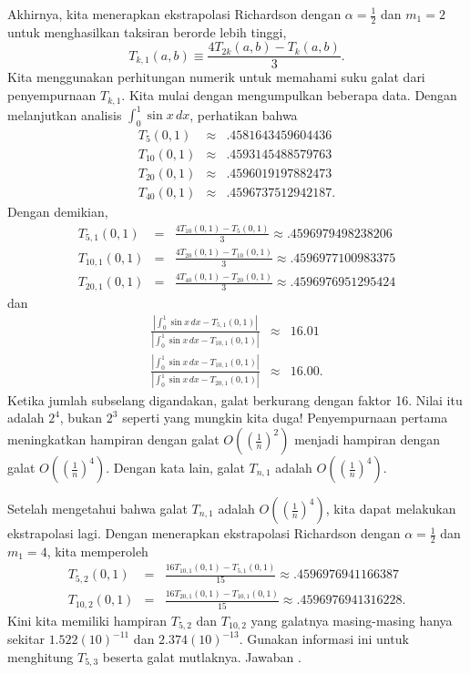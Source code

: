 Akhirnya, kita menerapkan ekstrapolasi Richardson dengan $\alpha=\frac{1}{2}$
dan $m_{1}=2$ untuk menghasilkan taksiran berorde lebih tinggi,
\[
T_{k,1}(a,b)\equiv\frac{4T_{2k}(a,b)-T_{k}(a,b)}{3}.
\]
Kita menggunakan perhitungan numerik untuk memahami suku galat dari
penyempurnaan $T_{k,1}$. Kita mulai dengan mengumpulkan beberapa
data. Dengan melanjutkan analisis $\int_{0}^{1}\sin x\,dx$, perhatikan
bahwa
\begin{eqnarray*}
T_{5}(0,1) & \approx & .4581643459604436\\
T_{10}(0,1) & \approx & .4593145488579763\\
T_{20}(0,1) & \approx & .4596019197882473\\
T_{40}(0,1) & \approx & .4596737512942187.
\end{eqnarray*}
Dengan demikian,
\begin{eqnarray*}
T_{5,1}(0,1) & = & \frac{4T_{10}(0,1)-T_{5}(0,1)}{3}\approx.4596979498238206\\
T_{10,1}(0,1) & = & \frac{4T_{20}(0,1)-T_{10}(0,1)}{3}\approx.4596977100983375\\
T_{20,1}(0,1) & = & \frac{4T_{40}(0,1)-T_{20}(0,1)}{3}\approx.4596976951295424
\end{eqnarray*}
dan
\begin{eqnarray*}
\frac{\left|\int_{0}^{1}\sin x\,dx-T_{5,1}(0,1)\right|}{\left|\int_{0}^{1}\sin x\,dx-T_{10,1}(0,1)\right|} & \approx & 16.01\\
\frac{\left|\int_{0}^{1}\sin x\,dx-T_{10,1}(0,1)\right|}{\left|\int_{0}^{1}\sin x\,dx-T_{20,1}(0,1)\right|} & \approx & 16.00.
\end{eqnarray*}
Ketika jumlah subselang digandakan, galat berkurang dengan faktor
16. Nilai itu adalah $2^{4}$, bukan $2^{3}$ seperti yang mungkin
kita duga! Penyempurnaan pertama meningkatkan hampiran dengan galat
$O\left(\left(\frac{1}{n}\right)^{2}\right)$ menjadi hampiran dengan
galat $O\left(\left(\frac{1}{n}\right)^{4}\right)$. Dengan kata lain,
galat $T_{n,1}$ adalah $O\left(\left(\frac{1}{n}\right)^{4}\right)$.

Setelah mengetahui bahwa galat $T_{n,1}$ adalah $O\left(\left(\frac{1}{n}\right)^{4}\right)$,
kita dapat melakukan ekstrapolasi lagi. Dengan menerapkan ekstrapolasi
Richardson dengan $\alpha=\frac{1}{2}$ dan $m_{1}=4$, kita memperoleh
\begin{eqnarray*}
T_{5,2}(0,1) & = & \frac{16T_{10,1}(0,1)-T_{5,1}(0,1)}{15}\approx.4596976941166387\\
T_{10,2}(0,1) & = & \frac{16T_{20,1}(0,1)-T_{10,1}(0,1)}{15}\approx.4596976941316228.
\end{eqnarray*}
Kini kita memiliki hampiran $T_{5,2}$ dan $T_{10,2}$ yang galatnya
masing-masing hanya sekitar $1.522(10)^{-11}$ dan $2.374(10)^{-13}$.
Gunakan informasi ini untuk menghitung $T_{5,3}$ beserta galat mutlaknya.
Jawaban .

